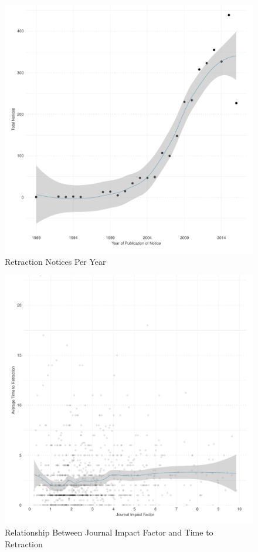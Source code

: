 \documentclass[12pt]{article}
\begin{document}
\begin{figure}[t]
\centering
\includegraphics[scale=.7]{../figs/n_retraction_notices_by_year.pdf}
\caption{Retraction Notices Per Year}
\label{fig:n_retraction_notices_per_year}
\end{figure}

\begin{figure}[t]
\centering
\includegraphics[scale=.7]{../figs/jif_time_to_retraction.pdf}
\caption{Relationship Between Journal Impact Factor and Time to Retraction}
\label{fig:jif_ttr}
\end{figure}
\end{document}
